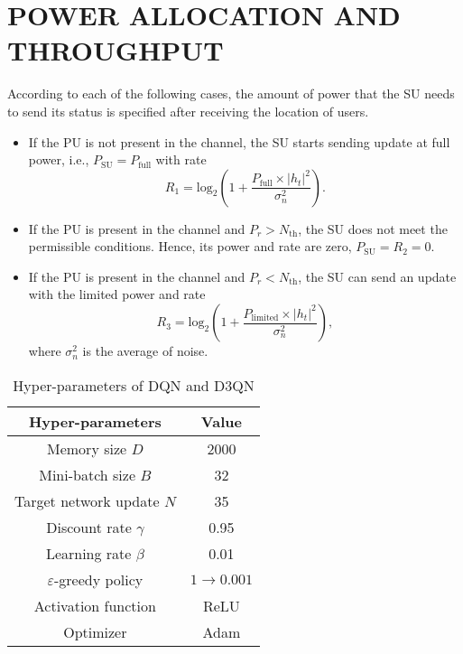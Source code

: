 \documentclass[journal]{IEEEtran}
\begin{document}
	\section{POWER ALLOCATION AND THROUGHPUT}
		According to each of the following cases, the amount of power that the SU needs to send its status is specified after receiving the location of users.
		\begin{itemize}
			\item If the PU is not present in the channel, the SU starts sending update at full power, i.e., ${P_{\text{SU}}} = {P_{\text{full}}}$ with rate
				\begin{equation}
						{R_1} = \text{lo}{\text{g}_2}\left(1 + \frac{{{P_{\text{full}}} \times {{\left| {{h_t}} \right|}^2}}}{{\sigma _n^2}}\right).
				\end{equation}
			\item If the PU is present in the channel and $P_r>N_{\text{th}}$, the SU does not meet the permissible conditions. Hence, its power and rate are zero, $P_{\text{SU}}=R_2=0$.
			\item If the PU is present in the channel and $P_r<N_{\text{th}}$, the SU can send an update with the limited power and rate
				\begin{equation}
						{R_3} = \text{lo}{\text{g}_2}\left(1 + \frac{{{P_{\text{limited}}} \times {{\left| {{h_t}} \right|}^2}}}{{\sigma _n^2}}\right),
				\end{equation}
			where ${\sigma _n^2}$ is the average of noise.
		\end{itemize}
	
		\begin{table}[!t]
			\renewcommand{\arraystretch}{1.3}
			\caption{Hyper-parameters of DQN and D3QN}
			\label{Hyper-parameters}
			\centering
			\begin{tabular}{|c|c|}
				\hline
				\bfseries \textbf{Hyper-parameters} & \bfseries \textbf{Value}\\
				\hline
				Memory size $D$ & 2000\\
				\hline
				Mini-batch size $B$ & 32\\
				\hline
				Target network update $N$ & 35\\
				\hline
				Discount rate $\gamma$ & 0.95\\
				\hline
				Learning rate $\beta$ & 0.01\\
				\hline
				$\varepsilon$-greedy policy & $1 \to 0.001$\\
				\hline
				Activation function & ReLU\\
				\hline
				Optimizer & Adam\\
				\hline
			\end{tabular}
		\end{table}
	
\end{document}
